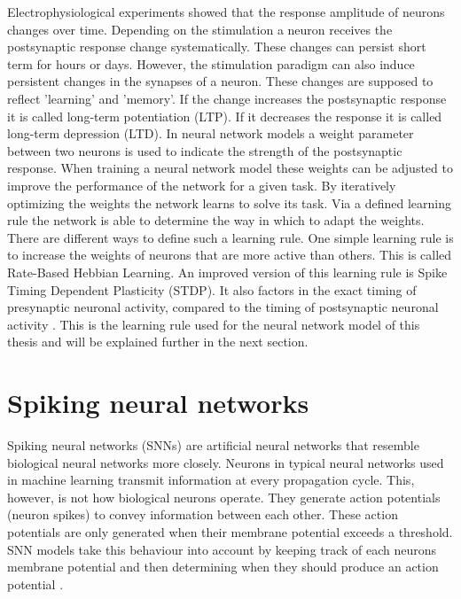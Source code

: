 Electrophysiological experiments showed that the response amplitude of neurons changes over time. Depending on the stimulation a neuron receives the postsynaptic response change systematically. These changes can persist short term for hours or days. However, the stimulation paradigm can also induce persistent changes in the synapses of a neuron. These changes are supposed to reflect 'learning' and 'memory'. If the change increases the postsynaptic response it is called long-term potentiation (LTP). If it decreases the response it is called long-term depression (LTD).
In neural network models a weight parameter between two neurons is used to indicate the strength of the postsynaptic response. When training a neural network model these weights can be adjusted to improve the performance of the network for a given task. By iteratively optimizing the weights the network learns to solve its task. Via a defined learning rule the network is able to determine the way in which to adapt the weights. There are different ways to define such a learning rule. One simple learning rule is to increase the weights of neurons that are more active than others. This is called Rate-Based Hebbian Learning. An improved version of this learning rule is Spike Timing Dependent Plasticity (STDP). It also factors in the exact timing of presynaptic neuronal activity, compared to the timing of postsynaptic neuronal activity \citep{SpikingNeuronModelsBook}. This is the learning rule used for the neural network model of this thesis and will be explained further in the next section.


\section{Spiking neural networks}

Spiking neural networks (SNNs) are artificial neural networks that resemble biological neural networks more closely. Neurons in typical neural networks used in machine learning transmit information at every propagation cycle. This, however, is not how biological neurons operate. They generate action potentials (neuron spikes) to convey information between each other. These action potentials are only generated when their membrane potential exceeds a threshold. SNN models take this behaviour into account by keeping track of each neurons membrane potential and then determining when they should produce an action potential  \citep{SpikingNeuronModelsBook}.

